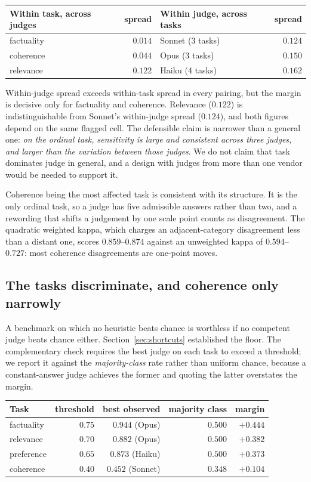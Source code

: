\begin{center}
\begin{tabular}{lrlr}
\toprule
Within task, across judges & spread & Within judge, across tasks & spread \\
\midrule
factuality & $0.014$ & Sonnet (3 tasks) & $0.124$ \\
coherence  & $0.044$ & Opus (3 tasks)   & $0.150$ \\
relevance  & $0.122$ & Haiku (4 tasks)  & $0.162$ \\
\bottomrule
\end{tabular}
\end{center}

Within-judge spread exceeds within-task spread in every pairing, but the margin
is decisive only for factuality and coherence. Relevance ($0.122$) is
indistinguishable from Sonnet's within-judge spread ($0.124$), and both figures
depend on the same flagged cell. The defensible claim is narrower than a general
one: \emph{on the ordinal task, sensitivity is large and consistent across three
judges, and larger than the variation between those judges}. We do not claim
that task dominates judge in general, and a design with judges from more than one
vendor would be needed to support it.

Coherence being the most affected task is consistent with its structure. It is
the only ordinal task, so a judge has five admissible answers rather than two,
and a rewording that shifts a judgement by one scale point counts as
disagreement. The quadratic weighted kappa, which charges an adjacent-category
disagreement less than a distant one, scores $0.859$--$0.874$ against an
unweighted kappa of $0.594$--$0.727$: most coherence disagreements are one-point
moves.

\subsection{The tasks discriminate, and coherence only narrowly}
\label{sec:results-discriminate}

A benchmark on which no heuristic beats chance is worthless if no competent judge
beats chance either. Section~\ref{sec:shortcuts} established the floor. The
complementary check requires the best judge on each task to exceed a threshold;
we report it against the \emph{majority-class} rate rather than uniform chance,
because a constant-answer judge achieves the former and quoting the latter
overstates the margin.

\begin{center}
\begin{tabular}{lrrrr}
\toprule
Task & threshold & best observed & majority class & margin \\
\midrule
factuality & $0.75$ & $0.944$ (Opus)   & $0.500$ & $+0.444$ \\
relevance  & $0.70$ & $0.882$ (Opus)   & $0.500$ & $+0.382$ \\
preference & $0.65$ & $0.873$ (Haiku)  & $0.500$ & $+0.373$ \\
coherence  & $0.40$ & $0.452$ (Sonnet) & $0.348$ & $+0.104$ \\
\bottomrule
\end{tabular}
\end{center}

